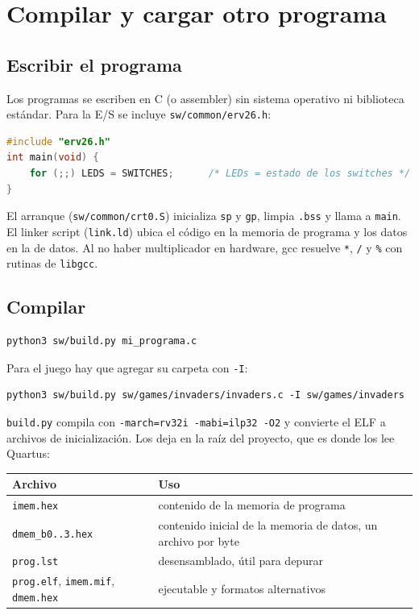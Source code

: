 \documentclass[11pt,a4paper]{article}
\newcommand{\code}[1]{\texttt{#1}}
\begin{document}
\section{Compilar y cargar otro programa}

\subsection{Escribir el programa}

Los programas se escriben en C (o assembler) sin sistema operativo ni biblioteca estándar. Para la E/S se incluye \code{sw/common/erv26.h}:

\noindent\begin{minipage}{\linewidth}
\begin{lstlisting}[language=C]
#include "erv26.h"
int main(void) {
    for (;;) LEDS = SWITCHES;      /* LEDs = estado de los switches */
}
\end{lstlisting}
\end{minipage}

El arranque (\code{sw/common/crt0.S}) inicializa \code{sp} y \code{gp}, limpia \code{.bss} y llama a \code{main}. El linker script (\code{link.ld}) ubica el código en la memoria de programa y los datos en la de datos. Al no haber multiplicador en hardware, gcc resuelve \code{*}, \code{/} y \code{\%} con rutinas de \code{libgcc}.

\subsection{Compilar}

\begin{lstlisting}
python3 sw/build.py mi_programa.c
\end{lstlisting}

Para el juego hay que agregar su carpeta con \code{-I}:
\begin{lstlisting}
python3 sw/build.py sw/games/invaders/invaders.c -I sw/games/invaders
\end{lstlisting}

\code{build.py} compila con \code{-march=rv32i -mabi=ilp32 -O2} y convierte el ELF a archivos de inicialización. Los deja en la raíz del proyecto, que es donde los lee Quartus:

\begin{center}
\begin{tabular}{ll}
\toprule
Archivo & Uso \\
\midrule
\code{imem.hex} & contenido de la memoria de programa \\
\code{dmem\_b0..3.hex} & contenido inicial de la memoria de datos, un archivo por byte \\
\code{prog.lst} & desensamblado, útil para depurar \\
\code{prog.elf}, \code{imem.mif}, \code{dmem.hex} & ejecutable y formatos alternativos \\
\bottomrule
\end{tabular}
\end{center}
\end{document}
